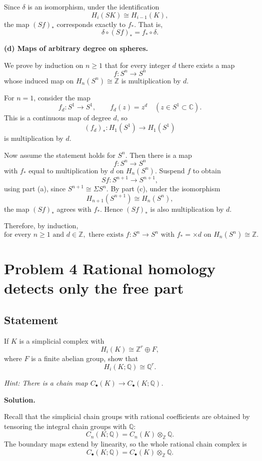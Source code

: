 \documentclass[12pt,a4paper]{article}
\theoremstyle{notespace}
\begin{document}
Since \(\delta\) is an isomorphism, under the identification
\[
H_i(SK)\cong H_{i-1}(K),
\]
the map \((Sf)_*\) corresponds exactly to \(f_*\). That is,
\[
\boxed{\delta\circ (Sf)_*=f_*\circ \delta.}
\]

\medskip

\textbf{(d) Maps of arbitrary degree on spheres.}

We prove by induction on \(n\ge 1\) that for every integer \(d\) there exists a map
\[
f:S^n\to S^n
\]
whose induced map on \(H_n(S^n)\cong \mathbb Z\) is multiplication by \(d\).

For \(n=1\), consider the map
\[
f_d:S^1\to S^1,
\qquad
f_d(z)=z^d
\quad (z\in S^1\subset \mathbb C).
\]
This is a continuous map of degree \(d\), so
\[
(f_d)_*:H_1(S^1)\to H_1(S^1)
\]
is multiplication by \(d\).

Now assume the statement holds for \(S^n\). Then there is a map
\[
f:S^n\to S^n
\]
with \(f_*\) equal to multiplication by \(d\) on \(H_n(S^n)\). Suspend \(f\) to obtain
\[
Sf:S^{n+1}\to S^{n+1},
\]
using part (a), since \(S^{n+1}\cong \Sigma S^n\). By part (c), under the isomorphism
\[
H_{n+1}(S^{n+1})\cong H_n(S^n),
\]
the map \((Sf)_*\) agrees with \(f_*\). Hence \((Sf)_*\) is also multiplication by \(d\).

Therefore, by induction,
\[
\boxed{\text{for every }n\ge 1\text{ and }d\in\mathbb Z,\text{ there exists }f:S^n\to S^n
	\text{ with }f_*=\times d\text{ on }H_n(S^n)\cong \mathbb Z.}
\]

\section{Problem 4 Rational homology detects only the free part}

\subsection*{Statement}
If \(K\) is a simplicial complex with
\[
H_i(K)\cong \mathbb Z^r\oplus F,
\]
where \(F\) is a finite abelian group, show that
\[
H_i(K;\mathbb Q)\cong \mathbb Q^r.
\]

\emph{Hint: There is a chain map \(C_\bullet(K)\to C_\bullet(K;\mathbb Q)\).}

\textbf{Solution.}

Recall that the simplicial chain groups with rational coefficients are obtained by tensoring the integral chain groups with \(\mathbb Q\):
\[
C_n(K;\mathbb Q)=C_n(K)\otimes_{\mathbb Z}\mathbb Q.
\]
The boundary maps extend by linearity, so the whole rational chain complex is
\[
C_\bullet(K;\mathbb Q)=C_\bullet(K)\otimes_{\mathbb Z}\mathbb Q.
\]
\end{document}
